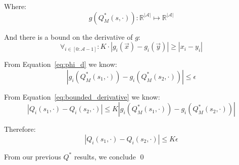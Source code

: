 \documentclass[11pt]{amsart}
\begin{document}
Where:
\begin{equation}
g(Q_M^*(s,\cdot)) : \mathbb{R}^{|\mathcal{A}|} \longmapsto \mathbb{R}^{|\mathcal{A}|}
\end{equation}

And there is a bound on the derivative of $g$:
\begin{equation}
\forall_{i \in [0:\mathcal{A}-1]} : K \cdot |g_i(\vec{x}) - g_i(\vec{y})| \geq |x_i - y_i |
\label{eq:bounded_derivative}
\end{equation}

From Equation~\ref{eq:phi_d} we know:
\begin{equation}
|g_i(Q_M^*(s_1,\cdot)) - g_i(Q_M^*(s_2,\cdot))| \leq \epsilon
\end{equation}

From Equation~\ref{eq:bounded_derivative} we know:
\begin{equation}
|Q_i(s_1,\cdot) - Q_i(s_2,\cdot)| \leq K |g_i(Q_M^*(s_1,\cdot)) - g_i(Q_M^*(s_2,\cdot))|
\end{equation}

Therefore:
\begin{equation}
|Q_i(s_1,\cdot) - Q_i(s_2,\cdot)| \leq K \epsilon
\end{equation}

From our previous $Q^*$ results, we conclude \qed
\end{document}
